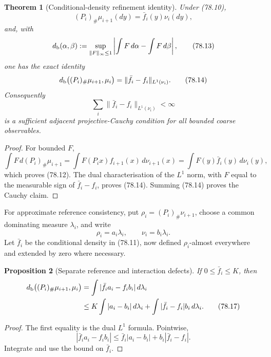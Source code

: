 \documentclass[11pt]{article}
\newtheorem{theorem}{Theorem}[section]
\newtheorem{proposition}[theorem]{Proposition}
\begin{document}
\begin{theorem}[Conditional-density refinement identity]
\label{thm:v11v78-martingale}
Under (78.10),
\[
                       (P_i)_\#\mu_{i+1}(dy)
                       =\bar f_i(y)\nu_i(dy),                 \tag{78.12}
\]
and, with
\[
 d_{\rm b}(\alpha,\beta)
 :=\sup_{\|F\|_\infty\le1}
       \left|\int F\,d\alpha-\int F\,d\beta\right|,           \tag{78.13}
\]
one has the exact identity
\[
 d_{\rm b}\big((P_i)_\#\mu_{i+1},\mu_i\big)
                    =\|\bar f_i-f_i\|_{L^1(\nu_i)}.           \tag{78.14}
\]
Consequently
\[
          \sum_i\|\bar f_i-f_i\|_{L^1(\nu_i)}<\infty          \tag{78.15}
\]
is a sufficient adjacent projective-Cauchy condition for all bounded
coarse observables.
\end{theorem}

\begin{proof}
For bounded \(F\),
\[
 \int F\,d(P_i)_\#\mu_{i+1}
 =\int F(P_ix)f_{i+1}(x)\,d\nu_{i+1}(x)
 =\int F(y)\bar f_i(y)\,d\nu_i(y),
\]
which proves (78.12).  The dual characterisation of the \(L^1\) norm,
with \(F\) equal to the measurable sign of
\(\bar f_i-f_i\), proves (78.14).  Summing (78.14) proves the Cauchy
claim.
\end{proof}

For approximate reference consistency, put
\(\rho_i=(P_i)_\#\nu_{i+1}\), choose a common dominating measure
\(\lambda_i\), and write
\[
                   \rho_i=a_i\lambda_i,\qquad
                   \nu_i=b_i\lambda_i.                       \tag{78.16}
\]
Let \(\bar f_i\) be the conditional density in (78.11), now defined
\(\rho_i\)-almost everywhere and extended by zero where necessary.

\begin{proposition}[Separate reference and interaction defects]
\label{prop:v11v78-two-defects}
If \(0\le\bar f_i\le K\), then
\[
 \begin{split}
 d_{\rm b}\big((P_i)_\#\mu_{i+1},\mu_i\big)
 &=\int|\bar f_i a_i-f_i b_i|\,d\lambda_i\\
 &\le K\int|a_i-b_i|\,d\lambda_i
       +\int|\bar f_i-f_i|b_i\,d\lambda_i.                   \tag{78.17}
 \end{split}
\]
\end{proposition}

\begin{proof}
The first equality is the dual \(L^1\) formula.  Pointwise,
\[
 |\bar f_i a_i-f_i b_i|
 \le\bar f_i|a_i-b_i|+b_i|\bar f_i-f_i|.
\]
Integrate and use the bound on \(\bar f_i\).
\end{proof}
\end{document}
